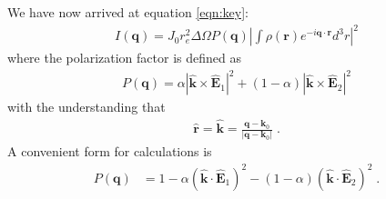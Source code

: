 \documentclass[12pt]{article}
\renewcommand{\vec}[1]{\boldsymbol{#1}}
\newcommand{\hvec}[1]{\hat{\vec{#1}}}
\newcommand{\abs}[1]{\left| #1 \right|}
\begin{document}
We have now arrived at equation \ref{eqn:key}:
\begin{align}
    I(\vec{q}) = J_0 r_e^2 \Delta \Omega P(\vec{q})  \abs{\int  \rho(\vec{r}) e^{-i \vec{q}\cdot\vec{r}} d^3 r }^2
\end{align}
where the polarization factor is defined as
\begin{align}\label{eqn:goodpol}
 P(\vec{q}) = \alpha | \hvec{k} \times  \hvec{E}_1 |^2 + (1-\alpha) | \hvec{k} \times \hvec{E}_2 |^2
\end{align}
with the understanding that 
\begin{align}
 \hvec{r} = \hvec{k} = \frac{\vec{q} - \vec{k}_0}{\abs{\vec{q} - \vec{k}_0}} \;.
\end{align}
A convenient form for calculations is
\begin{align}
 P(\vec{q}) &= 1 - \alpha(\hvec{k} \cdot \hvec{E}_1 )^2 - (1-\alpha)(\hvec{k} \cdot \hvec{E}_2 )^2 \;.
\end{align}
\end{document}
